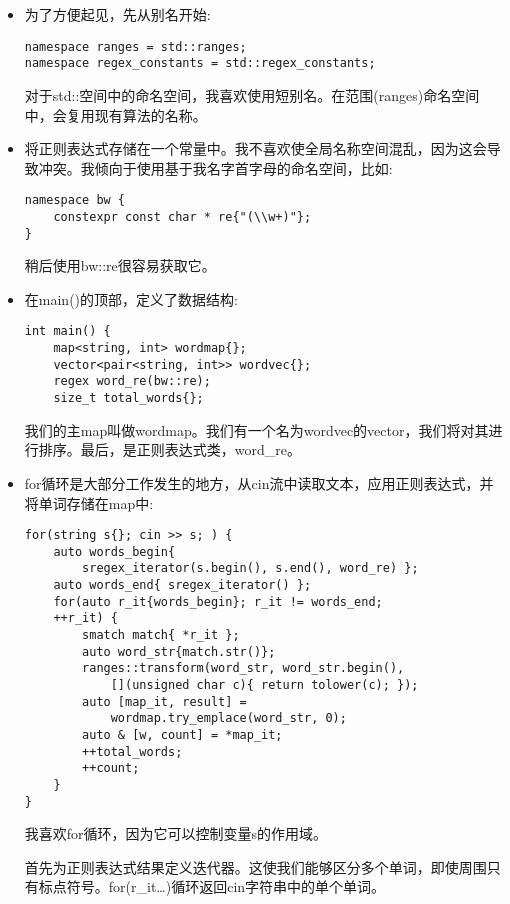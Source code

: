 \begin{itemize}
\item 
为了方便起见，先从别名开始:

\begin{lstlisting}[style=styleCXX]
namespace ranges = std::ranges;
namespace regex_constants = std::regex_constants;
\end{lstlisting}

对于std::空间中的命名空间，我喜欢使用短别名。在范围(ranges)命名空间中，会复用现有算法的名称。

\item 
将正则表达式存储在一个常量中。我不喜欢使全局名称空间混乱，因为这会导致冲突。我倾向于使用基于我名字首字母的命名空间，比如:

\begin{lstlisting}[style=styleCXX]
namespace bw {
	constexpr const char * re{"(\\w+)"};
}
\end{lstlisting}

稍后使用bw::re很容易获取它。

\item 
在main()的顶部，定义了数据结构:

\begin{lstlisting}[style=styleCXX]
int main() {
	map<string, int> wordmap{};
	vector<pair<string, int>> wordvec{};
	regex word_re(bw::re);
	size_t total_words{};
\end{lstlisting}

我们的主map叫做wordmap。我们有一个名为wordvec的vector，我们将对其进行排序。最后，是正则表达式类，word\_re。

\item 
for循环是大部分工作发生的地方，从cin流中读取文本，应用正则表达式，并将单词存储在map中:

\begin{lstlisting}[style=styleCXX]
for(string s{}; cin >> s; ) {
	auto words_begin{
		sregex_iterator(s.begin(), s.end(), word_re) };
	auto words_end{ sregex_iterator() };
	for(auto r_it{words_begin}; r_it != words_end;
	++r_it) {
		smatch match{ *r_it };
		auto word_str{match.str()};
		ranges::transform(word_str, word_str.begin(),
			[](unsigned char c){ return tolower(c); });
		auto [map_it, result] =
			wordmap.try_emplace(word_str, 0);
		auto & [w, count] = *map_it;
		++total_words;
		++count;
	}
}
\end{lstlisting}

我喜欢for循环，因为它可以控制变量s的作用域。

首先为正则表达式结果定义迭代器。这使我们能够区分多个单词，即使周围只有标点符号。for(r\_it…)循环返回cin字符串中的单个单词。


\end{itemize}
